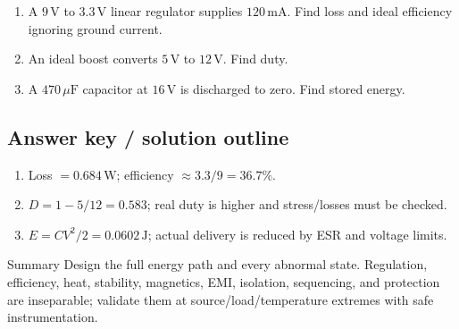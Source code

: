 \documentclass[10pt,letterpaper]{article}
\begin{document}
\begin{enumerate}
  \item A $9\,\mathrm{V}$ to $3.3\,\mathrm{V}$ linear regulator supplies $120\,\mathrm{mA}$. Find loss and ideal efficiency ignoring ground current.
  \item An ideal boost converts $5\,\mathrm{V}$ to $12\,\mathrm{V}$. Find duty.
  \item A $470\,\mu\mathrm{F}$ capacitor at $16\,\mathrm{V}$ is discharged to zero. Find stored energy.
\end{enumerate}\subsection{Answer key / solution outline}
\begin{enumerate}
  \item Loss $=0.684\,\mathrm{W}$; efficiency $\approx3.3/9=36.7\%$.
  \item $D=1-5/12=0.583$; real duty is higher and stress/losses must be checked.
  \item $E=CV^2/2=0.0602\,\mathrm{J}$; actual delivery is reduced by ESR and voltage limits.
\end{enumerate}\begin{CornellSummaryBox}{Summary}
Design the full energy path and every abnormal state. Regulation, efficiency, heat, stability, magnetics, EMI, isolation, sequencing, and protection are inseparable; validate them at source/load/temperature extremes with safe instrumentation.
\end{CornellSummaryBox}
\end{document}
